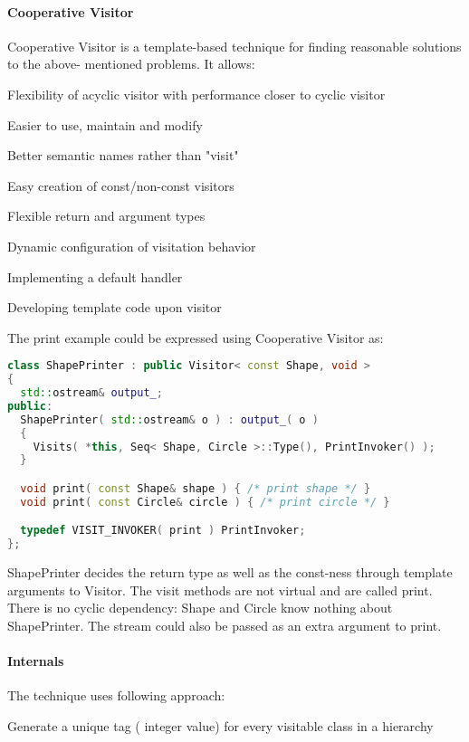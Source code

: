 \documentclass{book}
\begin{document}
\paragraph{Cooperative Visitor}

Cooperative Visitor is a template-based technique for finding reasonable solutions to the above- mentioned problems. It allows:

    Flexibility of acyclic visitor with performance closer to cyclic visitor

    Easier to use, maintain and modify

    Better semantic names rather than "visit"

    Easy creation of const/non-const visitors

    Flexible return and argument types

    Dynamic configuration of visitation behavior

    Implementing a default handler

    Developing template code upon visitor

The print example could be expressed using Cooperative Visitor as:


\begin{lstlisting}[caption={visitor pattern sample code 6-4},language=C++]
class ShapePrinter : public Visitor< const Shape, void > 
{
  std::ostream& output_;
public:
  ShapePrinter( std::ostream& o ) : output_( o )
  {
    Visits( *this, Seq< Shape, Circle >::Type(), PrintInvoker() );
  }

  void print( const Shape& shape ) { /* print shape */ }
  void print( const Circle& circle ) { /* print circle */ }

  typedef VISIT_INVOKER( print ) PrintInvoker;
};
\end{lstlisting}

ShapePrinter decides the return type as well as the const-ness through template arguments to Visitor.
The visit methods are not virtual and are called print. There is no cyclic dependency: Shape and Circle know nothing about ShapePrinter.
The stream could also be passed as an extra argument to print.
\paragraph{Internals}

The technique uses following approach:

    Generate a unique tag ( integer value) for every visitable class in a hierarchy
\end{document}
